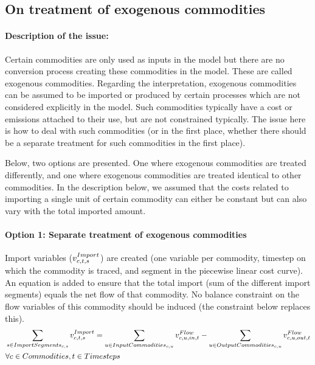 

\subsection{On treatment of exogenous commodities} \label{subsec:exogenous_commodities}



\paragraph{Description of the issue:}
Certain commodities are only used as inputs in the model but there are no conversion process creating these commodities in the model. These are called exogenous commodities. Regarding the interpretation, exogenous commodities can be assumed to be imported or produced by certain processes which are not considered explicitly in the model. Such commodities typically have a cost or emissions attached to their use, but are not constrained typically. The issue here is how to deal with such commodities (or in the first place, whether there should be a separate treatment for such commodities in the first place).

Below, two options are presented. One where exogenous commodities are treated differently, and one where exogenous commodities are treated identical to other commodities.  In the description below, we assumed that the costs related to importing a single unit of certain commodity can either be constant but can also vary with the total imported amount. 

\paragraph{Option 1: Separate treatment of exogenous commodities}
Import variables ($\vImport$) are created (one variable per commodity, timestep on which the commodity is traced, and segment in the piecewise linear cost curve). An equation is added to ensure that the total import (sum of the different import segments) equals the net flow of that commodity. No balance constraint on the flow variables of this commodity should be induced (the constraint below replaces this). 
\begin{align}
&\sum_{\segment \in \ImportSegments} \vImport =  \sum_{\unit \in \InputCommodities} \vFlow[\commodity,\unit,in,\timestep]  - \sum_{\unit \in \OutputCommodities} \vFlow[\commodity,\unit,out,\timestep]  \nonumber \\
& \forall \commodities, \timesteps
\end{align}

